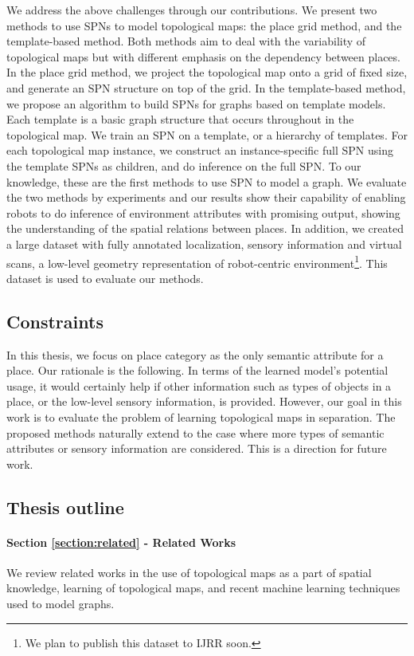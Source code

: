 \documentclass[10pt, titlepage]{article}
\theoremstyle{definition}
\begin{document}
We address the above challenges through our contributions. We present two methods to use SPNs to model topological maps: the place grid method, and the template-based method. Both methods aim to deal with the variability of topological maps but with different emphasis on the dependency between places. In the place grid method, we project the topological map onto a grid of fixed size, and generate an SPN structure on top of the grid. In the template-based method, we propose an algorithm to build SPNs for graphs based on template models. Each template is a basic graph structure that occurs throughout in the topological map. We train an SPN on a template, or a hierarchy of templates. For each topological map instance, we construct an instance-specific full SPN using the template SPNs as children, and do inference on the full SPN. To our knowledge, these are the first methods to use SPN to model a graph. We evaluate the two methods by experiments and our results show their capability of enabling robots to do inference of environment attributes with promising output, showing the understanding of the spatial relations between places. In addition, we created a large dataset with fully annotated localization, sensory information and virtual scans, a low-level geometry representation of robot-centric environment\footnote{We plan to publish this dataset to IJRR soon.}. This dataset is used to evaluate our methods.

\subsection{Constraints}
In this thesis, we focus on place category as the only semantic attribute for a place. Our rationale is the following. In terms of the learned model's potential usage, it would certainly help if other information such as types of objects in a place, or the low-level sensory information, is provided. However, our goal in this work is to evaluate the problem of learning topological maps in separation. The proposed methods naturally extend to the case where more types of semantic attributes or sensory information are considered. This is a direction for future work.


\subsection{Thesis outline}

\paragraph{Section \ref{section:related} - Related Works} We review related works in the use of topological maps as a part of spatial knowledge, learning of topological maps, and recent machine learning techniques used to model graphs.
\end{document}
